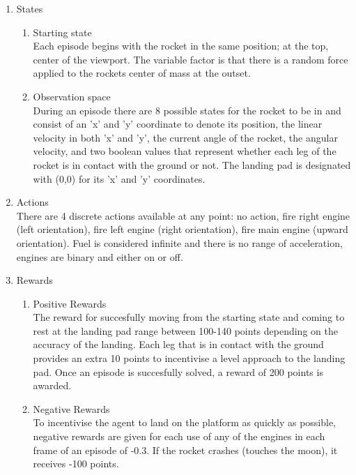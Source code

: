 \documentclass{article}
\begin{document}
\begin{enumerate}
  \item States
  \begin{enumerate}
    \item Starting state\\
    Each episode begins with the rocket in the same position; at the top, center of the viewport. The variable factor is that there is a random force applied to the rockets center of mass at the outset.
    
    \item Observation space\\
     During an episode there are 8 possible states for the rocket to be in and consist of an 'x' and 'y' coordinate to denote its position, the linear velocity in both 'x' and 'y', the current angle of the rocket, the angular velocity, and two boolean values that represent whether each leg of the rocket is in contact with the ground or not. The landing pad is designated with (0,0) for its 'x' and 'y' coordinates.
  \end{enumerate}
  \item Actions\\
    There are 4 discrete actions available at any point: no action, fire right engine (left orientation), fire left engine (right orientation), fire main engine (upward orientation). Fuel is considered infinite and there is no range of acceleration, engines are binary and either on or off.
  \item Rewards
  \begin{enumerate}
    \item Positive Rewards\\
    The reward for succesfully moving from the starting state and coming to rest at the landing pad range between 100-140 points depending on the accuracy of the landing. Each leg that is in contact with the ground provides an extra 10 points to incentivise a level approach to the landing pad. Once an episode is succesfully solved, a reward of 200 points is awarded.
    \item Negative Rewards\\
    To incentivise the agent to land on the platform as quickly as possible, negative rewards are given for each use of any of the engines in each frame of an episode of -0.3. If the rocket crashes (touches the moon), it receives -100 points.
  \end{enumerate}


\end{enumerate}
\end{document}
